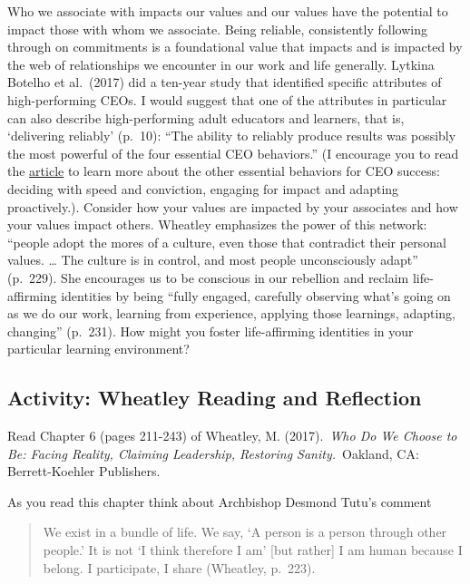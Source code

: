 \documentclass[
]{book}
\begin{document}
Who we associate with impacts our values and our values have the potential to impact those with whom we associate. Being reliable, consistently following through on commitments is a foundational value that impacts and is impacted by the web of relationships we encounter in our work and life generally. Lytkina Botelho et al.~(2017) did a ten-year study that identified specific attributes of high-performing CEOs. I would suggest that one of the attributes in particular can also describe high-performing adult educators and learners, that is, `delivering reliably' (p.~10): ``The ability to reliably produce results was possibly the most powerful of the four essential CEO behaviors.'' (I encourage you to read the \href{https://hbr.org/2017/05/what-sets-successful-ceos-apart}{article} to learn more about the other essential behaviors for CEO success: deciding with speed and conviction, engaging for impact and adapting proactively.). Consider how your values are impacted by your associates and how your values impact others. Wheatley emphasizes the power of this network: ``people adopt the mores of a culture, even those that contradict their personal values. \ldots{} The culture is in control, and most people unconsciously adapt'' (p.~229). She encourages us to be conscious in our rebellion and reclaim life-affirming identities by being ``fully engaged, carefully observing what's going on as we do our work, learning from experience, applying those learnings, adapting, changing'' (p.~231). How might you foster life-affirming identities in your particular learning environment?

\hypertarget{activity-wheatley-reading-and-reflection-2}{%
\subsection{Activity: Wheatley Reading and Reflection}\label{activity-wheatley-reading-and-reflection-2}}

\begin{reflect}
Read Chapter 6 (pages 211-243) of Wheatley, M. (2017).~\emph{Who Do We
Choose to Be: Facing Reality, Claiming Leadership, Restoring
Sanity.}~Oakland, CA: Berrett-Koehler Publishers.

As you read this chapter think about Archbishop Desmond Tutu's comment

\begin{quote}
We exist in a bundle of life. We say, `A person is a person through
other people.' It is not `I think therefore I am' {[}but rather{]} I am
human because I belong. I participate, I share (Wheatley, p.~223).
\end{quote}
\end{reflect}
\end{document}
